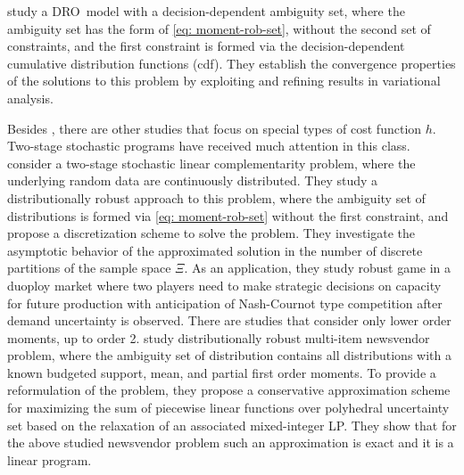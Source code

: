 \documentclass[final,onefignum,onetabnum]{class}
\newcommand{\dro}{DRO}
\begin{document}
\citet{royset2017} study a \dro\ model with a decision-dependent ambiguity set, where the ambiguity set has the form of \eqref{eq: moment-rob-set}, without the second set of constraints, and the first constraint is formed via the decision-dependent cumulative distribution functions (cdf). They establish the convergence properties of the solutions to this problem by exploiting and refining results in variational analysis. 

Besides \citet{shapiro2004minmax}, there are other studies that focus on special types of cost function $h$. Two-stage stochastic programs have received much attention in this class.
\citet{chen2018discrete} consider a  two-stage stochastic
linear complementarity problem, where the underlying random data are
continuously distributed. They study a distributionally robust approach to this problem, where the ambiguity set of distributions is formed via \eqref{eq: moment-rob-set} without the first constraint, and propose a discretization scheme to solve the problem. They investigate the asymptotic behavior of the approximated solution in the number of discrete partitions of the sample space $\Xi$. As an application, they study robust game in a duoploy market where two players need to make strategic
decisions on capacity for future production with anticipation of Nash-Cournot
type competition after demand uncertainty  is observed. 
There are studies that consider only lower order moments, up to order 2. 
\citet{ardestanijaafari2016} study distributionally robust multi-item newsvendor problem, where the ambiguity set of distribution contains all distributions with a known budgeted support, mean, and partial first order moments. To provide a reformulation of the problem, they propose  a conservative approximation scheme for maximizing the sum of piecewise linear functions over polyhedral uncertainty set based on the relaxation of an associated mixed-integer LP. They show that for the above studied newsvendor problem such an approximation is exact and  it is a linear program. 
\end{document}
